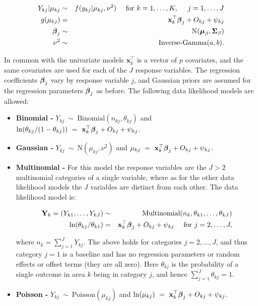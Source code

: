 \documentclass[article,shortnames,nojss]{jss}
\newcommand{\bd}[1]{\ensuremath{\mbox{\boldmath $#1$}}}
\begin{document}
\begin{eqnarray}
Y_{kj}|\mu_{kj}&\sim&f(y_{kj}|\mu_{kj}, \nu^2)~~~~\mbox{for }k=1,\ldots,K,~~~~ j=1,\ldots,J\label{equation MV likelihood}\\
g(\mu_{kj})&=& \mathbf{x}_{k}^{\top}\bd{\beta}_j + O_{kj} + \psi_{kj} \nonumber\\
\bd{\beta}_j&\sim&\mbox{N}(\bd{\mu}_{\beta}, \bd{\Sigma}_{\beta})\nonumber\\
\nu^2 &\sim& \mbox{Inverse-Gamma}(a,b).\nonumber
\end{eqnarray}

In common with the univariate models $\mathbf{x}_{k}^{\top}$ is a vector of $p$ covariates, and the same covariates are used for each of the $J$ response variables. The regression coefficients $\bd{\beta}_j$ vary by response variable $j$, and Gaussian priors are assumed for the regression parameters $\bd{\beta}_j$ as before. The following data likelihood models are allowed:

\begin{itemize}
\item \textbf{Binomial - } $Y_{kj}~\sim~\mbox{Binomial}(n_{kj}, \theta_{kj})$ and $\ln(\theta_{kj}/(1-\theta_{kj}))~=~\mathbf{x}_{k}^{\top}\bd{\beta}_j + O_{kj} + \psi_{kj}$. 

\item \textbf{Gaussian - } $Y_{kj}~\sim~\mbox{N}(\mu_{kj}, \nu^2)$ and $\mu_{kj}~=~\mathbf{x}_{k}^{\top}\bd{\beta}_j + O_{kj} + \psi_{kj}$.\\


\item \textbf{Multinomial - } For this model the response variables are the $J>2$ multinomial categories of a single variable, where as for the other data likelihood models the $J$ variables are distinct from each other. The data likelihood model is:

\begin{eqnarray}
\mathbf{Y}_k=(Y_{k1},\ldots, Y_{kJ})&\sim&\mbox{Multinomial}(n_{k}, \theta_{k1},\ldots,\theta_{kJ})\nonumber\\
\ln(\theta_{kj}/\theta_{k1})&=&\mathbf{x}_{k}^{\top}\bd{\beta}_j + O_{kj} + \psi_{kj}~~~~\mbox{for }j=2,\ldots,J,\nonumber
\end{eqnarray}

where $n_k=\sum_{j=1}^{J}Y_{kj}$. The above holds for categories $j=2,\ldots,J$, and thus category $j=1$ is a baseline and has no regression parameters or random effects or offset terms (they are all zero). Here $\theta_{kj}$ is the probability of a single outcome in area $k$ being in category $j$, and hence $\sum_{j=1}^{J}\theta_{kj}=1$.

\item \textbf{Poisson - } $Y_{kj}~\sim~\mbox{Poisson}(\mu_{kj})$ and $\ln(\mu_{kj})~=~\mathbf{x}_{k}^{\top}\bd{\beta}_j + O_{kj} + \psi_{kj}$. 
\end{itemize}
\end{document}
